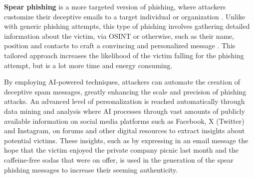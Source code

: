 \begin{comment}

Table \ref{tab:placeholder_label} presents a sample, legitimate URL and a non-functional URL used for phishing purposes. The target user is hoped by the attacker to be unaware of the different domains these seemingly similar URL's redirect the user. The phishing URL is taken from a dataset of known phishing websites but its domain is changed to IANA's example.com domain for security. The legitimate URL is from PayPal's website and is functional as of writing.

\begin{table}[h]
    \centering
    \begin{tabular}{|l|l|}
        \hline
        \textbf{Legitimate} & \textbf{Phishing} \\ \hline
        paypal.com/us/signin &paypal.com.cgi-bin.788a5.example.com \\ \hline
        login.ibm.com & login.lbm.example.com \\ \hline
        
    \end{tabular}
    \caption{Examples of legitimate URL's and non-working phishing URL's.}
    \label{tab:placeholder_label}
\end{table}

\end{comment}

\textbf{Spear phishing} is a more targeted version of phishing, where attackers customize their deceptive emails to a target individual or organization \citep{basitComprehensiveSurveyAIenabledPhishingAttacks2021}. Unlike with generic phishing attempts, this type of phishing involves gathering detailed information about the victim, via OSINT or otherwise, such as their name, position and contacts to craft a convincing and personalized message \citep{salahdineSocialEngineeringAttacks2019}. This tailored approach increases the likelihood of the victim falling for the phishing attempt, but is a lot more time and energy consuming.

By employing AI-powered techniques, attackers can automate the creation of deceptive spam messages, greatly enhancing the scale and precision of phishing attacks. An advanced level of personalization is reached automatically through data mining and analysis where AI processes through vast amounts of publicly available information on social media platforms such as Facebook, X (Twitter) and Instagram, on forums and other digital resources to extract insights about potential victims. These insights, such as by expressing in an email message the hope that the victim enjoyed the private company picnic last month and the caffeine-free sodas that were on offer, is used in the generation of the spear phishing messages to increase their seeming authenticity.



